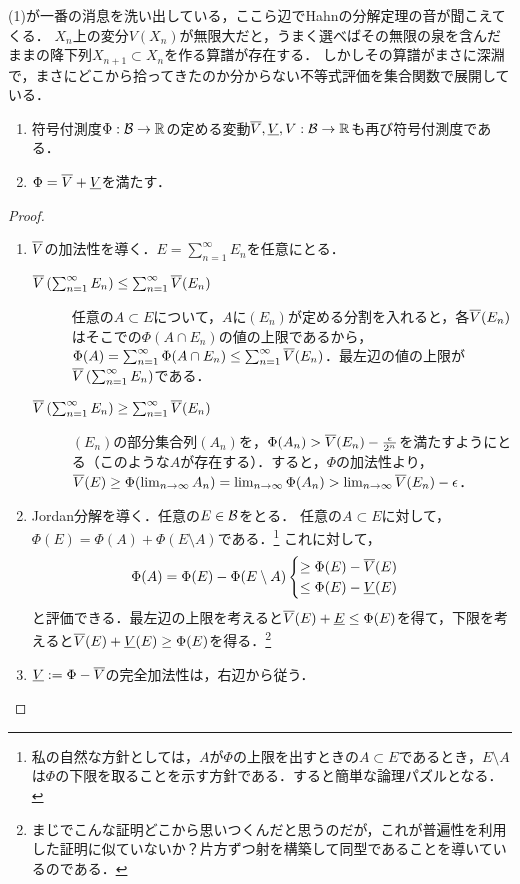 \documentclass[uplatex, dvipdfmx]{jsreport}
\begin{document}
\begin{remarks}[有界な符号付測度の全変動は有界である]
    (1)が一番の消息を洗い出している，ここら辺でHahnの分解定理の音が聞こえてくる．
    $X_n$上の変分$V(X_n)$が無限大だと，うまく選べばその無限の泉を含んだままの降下列$X_{n+1}\subset X_n$を作る算譜が存在する．
    しかしその算譜がまさに深淵で，まさにどこから拾ってきたのか分からない不等式評価を集合関数で展開している．
\end{remarks}

\begin{theorem}\mbox{}\label{thm-Jordan-decomposition}
    \begin{enumerate}
        \item 符号付測度$\Phi:\mathcal{B}\to\mathbb{R}$の定める変動$\overline{V},\underline{V},V:\mathcal{B}\to\mathbb{R}$も再び符号付測度である．
        \item $\Phi=\overline{V}+\underline{V}$を満たす．
    \end{enumerate}
\end{theorem}
\begin{proof}\mbox{}
    \begin{enumerate}
        \item $\overline{V}$の加法性を導く．$E=\sum^\infty_{n=1}E_n$を任意にとる．
        \begin{description}
            \item[$\overline{V}\left(\sum^\infty_{n=1}E_n\right)\le\sum^\infty_{n=1}\overline{V}(E_n)$] 任意の$A\subset E$について，$A$に$(E_n)$が定める分割を入れると，各$\overline{V}(E_n)$はそこでの$\Phi(A\cap E_n)$の値の上限であるから，$\Phi(A)=\sum^\infty_{n=1}\Phi(A\cap E_n)\le\sum^\infty_{n=1}\overline{V}(E_n)$．最左辺の値の上限が$\overline{V}\left(\sum^\infty_{n=1}E_n\right)$である．
            \item[$\overline{V}\left(\sum^\infty_{n=1}E_n\right)\ge\sum^\infty_{n=1}\overline{V}(E_n)$] $(E_n)$の部分集合列$(A_n)$を，$\Phi(A_n)>\overline{V}(E_n)-\frac{\epsilon}{2^n}$を満たすようにとる（このような$A$が存在する）．すると，$\Phi$の加法性より，$\overline{V}(E)\ge\Phi(\lim_{n\to\infty}A_n)=\lim_{n\to\infty}\Phi(A_n)>\lim_{n\to\infty}\overline{V}(E_n)-\epsilon$．
        \end{description}
        \item Jordan分解を導く．任意の$E\in\mathcal{B}$をとる．
        任意の$A\subset E$に対して，$\Phi(E)=\Phi(A)+\Phi(E\setminus A)$である．\footnote{私の自然な方針としては，$A$が$\Phi$の上限を出すときの$A\subset E$であるとき，$E\setminus A$は$\Phi$の下限を取ることを示す方針である．すると簡単な論理パズルとなる．}
        これに対して，
        \[\Phi(A)=\Phi(E)-\Phi(E\setminus A)\begin{cases}
            \ge\Phi(E)-\overline{V}(E)\\
            \le\Phi(E)-\underline{V}(E)
        \end{cases}\]
        と評価できる．最左辺の上限を考えると$\overline{V}(E)+\underline{E}\le\Phi(E)$を得て，下限を考えると$\overline{V}(E)+\underline{V}(E)\ge\Phi(E)$を得る．\footnote{まじでこんな証明どこから思いつくんだと思うのだが，これが普遍性を利用した証明に似ていないか？片方ずつ射を構築して同型であることを導いているのである．}
        \item $\underline{V}:=\Phi-\overline{V}$の完全加法性は，右辺から従う．
    \end{enumerate}
\end{proof}
\end{document}
